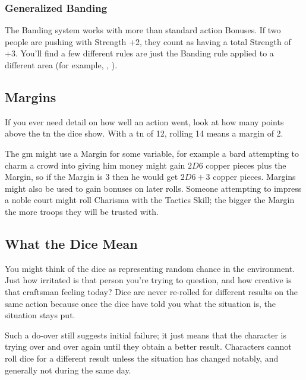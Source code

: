 \begin{multicols}{2}
\subsubsection{Generalized Banding}

The Banding system works with more than standard action Bonuses.
If two people are pushing with Strength +2, they count as having a total Strength of +3.
You'll find a few different rules are just the Banding rule applied to a different area (for example, , ).

\subsection{Margins}
\label{margin}

If you ever need detail on how well an action went, look at how many points above the \gls{tn} the dice show.
With a \gls{tn} of 12, rolling 14 means a margin of 2.

The \gls{gm} might use a Margin for some variable, for example a bard attempting to charm a crowd into giving him money might gain $2D6$ copper pieces plus the Margin, so if the Margin is 3 then he would get $2D6+3$ copper pieces.
Margins might also be used to gain bonuses on later rolls.
Someone attempting to impress a noble court might roll Charisma with the Tactics Skill; the bigger the Margin the more troops they will be trusted with.

\subsection{What the Dice Mean}

You might think of the dice as representing random chance in the environment. Just how irritated is that person you're trying to question, and how creative is that craftsman feeling today? Dice are never re-rolled for different results on the same action because once the dice have told you what the situation is, the situation stays put.

Such a do-over still suggests initial failure; it just means that the character is trying over and over again until they obtain a better result.
Characters cannot roll dice for a different result unless the situation has changed notably, and generally not during the same day.

\end{multicols}

\section{}
\label{weight}

